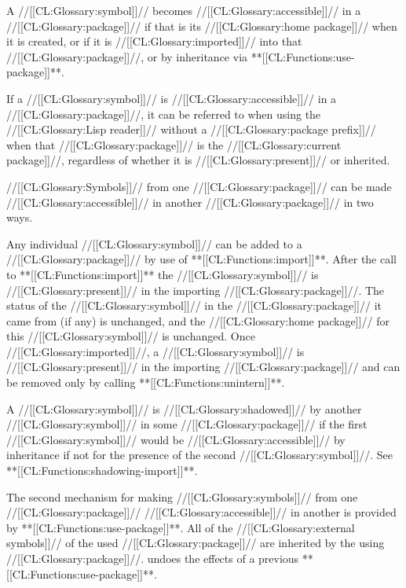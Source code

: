 \endsubsubsubsection%


A //[[CL:Glossary:symbol]]// becomes //[[CL:Glossary:accessible]]// in a //[[CL:Glossary:package]]// 
    if that is its //[[CL:Glossary:home package]]// when it is created,
 or if it is //[[CL:Glossary:imported]]// into that //[[CL:Glossary:package]]//,
 or by inheritance via **[[CL:Functions:use-package]]**.

If a //[[CL:Glossary:symbol]]// is //[[CL:Glossary:accessible]]// in a //[[CL:Glossary:package]]//, it can be referred to when using the //[[CL:Glossary:Lisp reader]]// without a //[[CL:Glossary:package prefix]]// when that //[[CL:Glossary:package]]// is the //[[CL:Glossary:current package]]//, regardless of whether it is //[[CL:Glossary:present]]// or inherited.

//[[CL:Glossary:Symbols]]// from one //[[CL:Glossary:package]]// can be made //[[CL:Glossary:accessible]]//  in another //[[CL:Glossary:package]]// in two ways.

\beginlist  \itemitem{--} Any individual //[[CL:Glossary:symbol]]// can be added to a //[[CL:Glossary:package]]// by use of **[[CL:Functions:import]]**.  After the call to **[[CL:Functions:import]]** the //[[CL:Glossary:symbol]]// is //[[CL:Glossary:present]]// in the importing //[[CL:Glossary:package]]//. The status of the //[[CL:Glossary:symbol]]// in the //[[CL:Glossary:package]]//  it came from (if any) is unchanged, and the //[[CL:Glossary:home package]]// for this //[[CL:Glossary:symbol]]// is unchanged. Once //[[CL:Glossary:imported]]//, a //[[CL:Glossary:symbol]]// is //[[CL:Glossary:present]]// in the importing //[[CL:Glossary:package]]// and can be removed only by calling **[[CL:Functions:unintern]]**.

A //[[CL:Glossary:symbol]]// is //[[CL:Glossary:shadowed]]// by another //[[CL:Glossary:symbol]]//  in some //[[CL:Glossary:package]]// if the first //[[CL:Glossary:symbol]]// would be //[[CL:Glossary:accessible]]// by inheritance if not for the presence of the second //[[CL:Glossary:symbol]]//. See **[[CL:Functions:shadowing-import]]**.

\itemitem{--} The second mechanism for making //[[CL:Glossary:symbols]]// from one //[[CL:Glossary:package]]// //[[CL:Glossary:accessible]]// in another is provided by **[[CL:Functions:use-package]]**.   All of the //[[CL:Glossary:external symbols]]// of the used //[[CL:Glossary:package]]// are inherited by the using //[[CL:Glossary:package]]//.  undoes the effects of a previous **[[CL:Functions:use-package]]**.   \endlist

